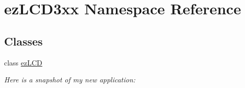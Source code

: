 \hypertarget{namespaceez_l_c_d3xx}{\section{ez\-L\-C\-D3xx Namespace Reference}
\label{namespaceez_l_c_d3xx}
}
\subsection*{Classes}
\begin{DoxyCompactItemize}
\item 
class \hyperlink{classez_l_c_d3xx_1_1ez_l_c_d}{ez\-L\-C\-D}
\begin{DoxyCompactList}\small\item\em Here is a snapshot of my new application\-: \end{DoxyCompactList}\end{DoxyCompactItemize}
